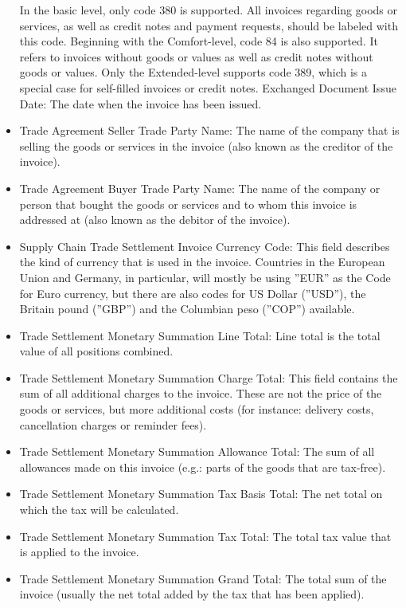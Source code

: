 \begin{itemize}
In the basic level, only code 380 is supported. All invoices regarding goods or services, as well as credit notes and payment requests, should be labeled with this code.
Beginning with the Comfort-level, code 84 is also supported. It refers to invoices without goods or values as well as credit notes without goods or values.
Only the Extended-level supports code 389, which is a special case for self-filled invoices or credit notes.
Exchanged Document Issue Date: The date when the invoice has been issued.
	\item Trade Agreement Seller Trade Party Name: The name of the company that is selling the goods or services in the invoice (also known as the creditor of the invoice).
	\item Trade Agreement Buyer Trade Party Name: The name of the company or person that bought the goods or services and to whom this invoice is addressed at (also known as the debitor of the invoice).
	\item Supply Chain Trade Settlement Invoice Currency Code: This field describes the kind of currency that is used in the invoice. Countries in the European Union and Germany, in particular, will mostly be using ''EUR'' as the Code for Euro currency, but there are also codes for US Dollar (''USD''), the Britain pound (''GBP'') and the Columbian peso (''COP'') available.
	\item Trade Settlement Monetary Summation Line Total: Line total is the total value of all positions combined.
	\item Trade Settlement Monetary Summation Charge Total: This field contains the sum of all additional charges to the invoice. These are not the price of the goods or services, but more additional costs (for instance: delivery costs, cancellation charges or reminder fees).
	\item Trade Settlement Monetary Summation Allowance Total: The sum of all allowances made on this invoice (e.g.: parts of the goods that are tax-free).
	\item Trade Settlement Monetary Summation Tax Basis Total: The net total on which the tax will be calculated.
	\item Trade Settlement Monetary Summation Tax Total: The total tax value that is applied to the invoice.
	\item Trade Settlement Monetary Summation Grand Total: The total sum of the invoice (usually the net total added by the tax that has been applied).
\end{itemize}

